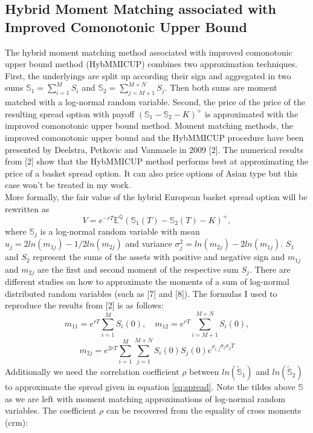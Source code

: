 \documentclass[a4paper]{article}
\begin{document}
\subsection{Hybrid Moment Matching associated with Improved Comonotonic Upper Bound}
\label{sec:hybmmicup}
The hybrid moment matching method associated with improved comonotonic upper bound method (HybMMICUP) combines two approximation techniques. First, the underlyings are split up according their sign and aggregated in two sums 
$\mathbb{S}_1=\sum_{i=1}^MS_i$ and $\mathbb{S}_2=\sum_{j=M+1}^{M+N}S_j.$ Then both sums are moment matched with a log-normal random variable. Second, the price of the price of the resulting spread option with payoff $(\mathbb{S}_1-\mathbb{S}_2-K)^+$ is approximated with the improved comonotonic upper bound method. Moment matching methods, the improved comonotonic upper bound and the HybMMICUP procedure have been presented by Deelstra, Petkovic and Vanmaele in 2009 [2]. The numerical results from [2] show that the HybMMICUP method  performs best at approximating the price of a basket spread option. It can also price options of Asian type but this case won’t be treated in my work.\\
More formally, the fair value of the hybrid European basket spread option will be rewritten as
\begin{equation}
\label{eq:spread}
V = e^{-rT}\mathbb{E}^\mathbb{Q}(\mathbb{S}_1(T) - \mathbb{S}_2(T) - K)^+, 
\end{equation} 
where $\mathbb{S}_j$ is a log-normal random variable with mean $u_j = 2ln(m_{1j}) - 1/2ln(m_{2j})$ and variance $\sigma_j^2 = ln(m_{2j})-2ln(m_{1j}).$
$S_1$ and $S_2$ represent the sums of the assets with positive and negative sign and $m_{1j}$ and $m_{2j}$ are the first and second moment of the respective sum $S_j$. There are different studies on how to approximate the moments of a sum of log-normal distributed random variables (such as [7] and [8]). The formulas I used to reproduce the results from [2] is as follows:
\begin{equation}
m_{11}=e^{rT}\sum_{i=1}^{M}S_i(0), \quad m_{12}=e^{rT}\sum_{i=M+1}^{M+N}S_i(0), 
\end{equation}
\begin{equation}
m_{2j}=e^{2rT}\sum_{i=1}^{M}\sum_{j=1}^{M+N}S_i(0)S_j(0)e^{\rho_{i,j}\sigma_i\sigma_jT}
\end{equation}
Additionally we need the correlation coefficient $\rho$ between $ln(\mathbb{\tilde{S}}_1)$ and $ln(\mathbb{\tilde{S}}_2)$ to approximate the spread given in equation \ref{eq:spread}. Note the tildes above $\mathbb{S}$ as we are left with moment matching approximations of log-normal random variables. The coefficient $\rho$ can be recovered from the equality of cross moments (crm):
\end{document}
